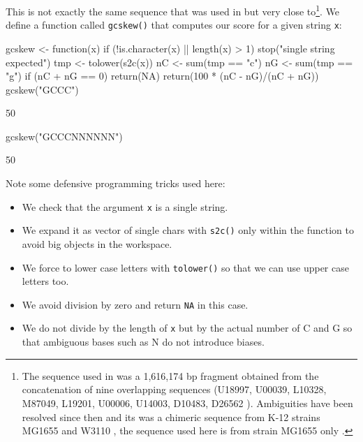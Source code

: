 \documentclass{article}
\begin{document}
This is not exactly the same sequence that was used in \cite{LobryMBE96}
but very close to\footnote{
The sequence used in \cite{LobryMBE96} was a 1,616,174 bp fragment obtained
from the concatenation of nine overlapping sequences
(U18997, U00039, L10328, M87049, L19201, U00006, U14003, D10483, D26562
\cite{SofiaHJ1994, BurlandV1993, DanielsDL1992, PlunkettG1993, BlattnerFR1993, YuraT1992}).
Ambiguities have been resolved since then and its was a chimeric sequence
from K-12 strains MG1655 and W3110 \cite{HayashiK2006}, the sequence used here
is from strain MG1655 only \cite{BlattnerFR1997}. 
}. We define a function called \texttt{gcskew()} that computes our score 
for a given string \texttt{x}:

\begin{Schunk}
\begin{Sinput}
 gcskew <- function(x) {
     if (!is.character(x) || length(x) > 1) 
         stop("single string expected")
     tmp <- tolower(s2c(x))
     nC <- sum(tmp == "c")
     nG <- sum(tmp == "g")
     if (nC + nG == 0) 
         return(NA)
     return(100 * (nC - nG)/(nC + nG))
 }
 gcskew("GCCC")
\end{Sinput}
\begin{Soutput}
[1] 50
\end{Soutput}
\begin{Sinput}
 gcskew("GCCCNNNNNN")
\end{Sinput}
\begin{Soutput}
[1] 50
\end{Soutput}
\end{Schunk}

Note some defensive programming tricks used here:

\begin{itemize}
\item We check that the argument \texttt{x} is a single string.
\item We expand it as vector of single chars with \texttt{s2c()} only within the
      function to avoid big objects in the workspace.
\item We force to lower case letters with \texttt{tolower()} so that we can use 
      upper case letters too.
\item We avoid division by zero and return \texttt{NA} in this case.
\item We do not divide by the length of \texttt{x} but by the actual number
      of C and G so that ambiguous bases such as N do not introduce biases.
\end{itemize}
\end{document}
